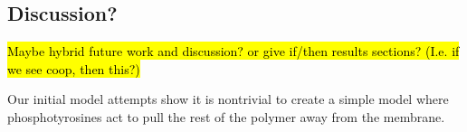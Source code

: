 \documentclass[../../AdvancementSummary.tex]{subfiles}
\begin{document}


\subsection{Discussion?}

\hl{Maybe hybrid future work and discussion? or give if/then results sections?  (I.e. if we see coop, then this?)}

Our initial model attempts show it is nontrivial to create a simple model where phosphotyrosines act to pull the rest of the polymer away from the membrane.























\end{document}
